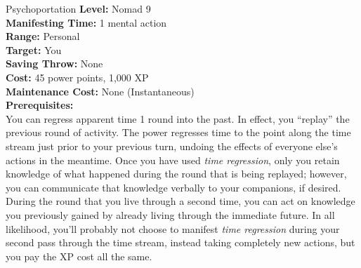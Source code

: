 {Psychoportation}
{
	\textbf{Level:}
	Nomad 9\\
	\textbf{Manifesting Time:}
	1 mental action\\
	\textbf{Range:}
	Personal\\
	\textbf{Target:}
	You\\
	\textbf{Saving Throw:}
	None\\
	\textbf{Cost:}
	45 power points, 1,000 XP\\
	\textbf{Maintenance Cost:}
	None (Instantaneous)\\
	\textbf{Prerequisites:}
	\\
}
{
	You can regress apparent time 1 round into the past. In effect, you ``replay'' the previous round of activity. The power regresses time to the point along the time stream just prior to your previous turn, undoing the effects of everyone else's actions in the meantime. Once you have used \emph{time regression}, only you retain knowledge of what happened during the round that is being replayed; however, you can communicate that knowledge verbally to your companions, if desired. During the round that you live through a second time, you can act on knowledge you previously gained by already living through the immediate future. In all likelihood, you'll probably not choose to manifest \emph{time regression} during your second pass through the time stream, instead taking completely new actions, but you pay the XP cost all the same.
}
